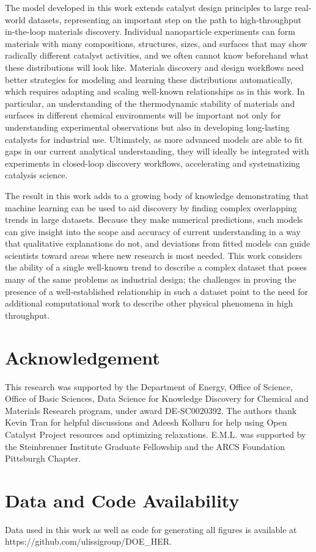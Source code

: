 \documentclass[preprint,12pt]{elsarticle}
\begin{document}
The model developed in this work extends catalyst design principles to large real-world datasets, representing an important step on the path to high-throughput in-the-loop materials discovery. Individual nanoparticle experiments can form materials with many compositions, structures, sizes, and surfaces that may show radically different catalyst activities, and we often cannot know beforehand what these distributions will look like. Materials discovery and design workflows need better strategies for modeling and learning these distributions automatically, which requires adapting and scaling well-known relationships as in this work. In particular, an understanding of the thermodynamic stability of materials and surfaces in different chemical environments will be important not only for understanding experimental observations but also in developing long-lasting catalysts for industrial use. Ultimately, as more advanced models are able to fit gaps in our current analytical understanding, they will ideally be integrated with experiments in closed-loop discovery workflows, accelerating and systematizing catalysis science.

The result in this work adds to a growing body of knowledge demonstrating that machine learning can be used to aid discovery by finding complex overlapping trends in large datasets. Because they make numerical predictions, such models can give insight into the scope and accuracy of current understanding in a way that qualitative explanations do not, and deviations from fitted models can guide scientists toward areas where new research is most needed. This work considers the ability of a single well-known trend to describe a complex dataset that poses many of the same problems as industrial design; the challenges in proving the presence of a well-established relationship in such a dataset point to the need for additional computational work to describe other physical phenomena in high throughput.


\section{Acknowledgement}
This research was supported by the Department of Energy, Office of Science, Office of Basic Sciences, Data Science for Knowledge Discovery for Chemical and Materials Research program, under award DE-SC0020392. The authors thank Kevin Tran for helpful discussions and Adeesh Kolluru for help using Open Catalyst Project resources and optimizing relaxations. E.M.L. was supported by the Steinbrenner Institute Graduate Fellowship and the ARCS Foundation Pittsburgh Chapter.

\section{Data and Code Availability}
Data used in this work as well as code for generating all figures is available at https://github.com/ulissigroup/DOE\_HER.


 


\appendix

\end{document}
